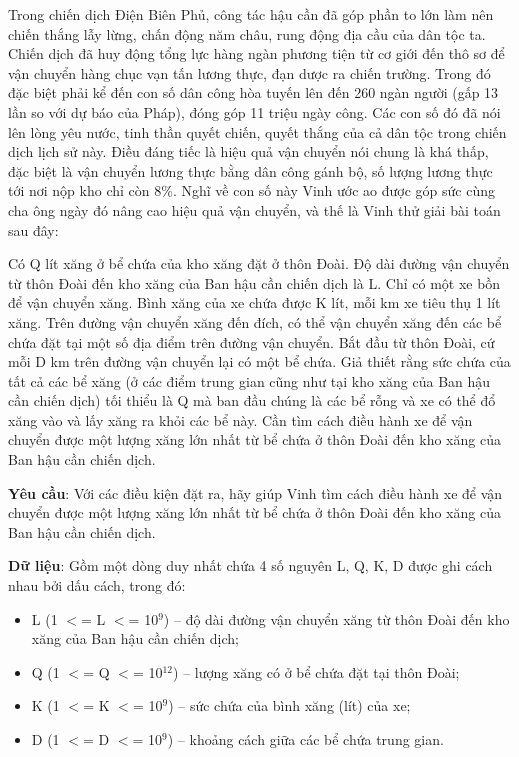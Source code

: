 

Trong chiến dịch Điện Biên Phủ, công tác hậu cần đã góp phần to lớn làm nên chiến thắng lẫy lừng, chấn động năm châu, rung động địa cầu của dân tộc ta. Chiến dịch đã huy động tổng lực hàng ngàn phương tiện từ cơ giới đến thô sơ để vận chuyển hàng chục vạn tấn lương thực, đạn dược ra chiến trường. Trong đó đặc biệt phải kể đến con số dân công hòa tuyến lên đến 260 ngàn người (gấp 13 lần so với dự báo của Pháp), đóng góp 11 triệu ngày công. Các con số đó đã nói lên lòng yêu nước, tinh thần quyết chiến, quyết thắng của cả dân tộc trong chiến dịch lịch sử này. Điều đáng tiếc là hiệu quả vận chuyển nói chung là khá thấp, đặc biệt là vận chuyển lương thực bằng dân công gánh bộ, số lượng lương thực tới nơi nộp kho chỉ còn 8\%. Nghĩ về con số này Vinh ước ao được góp sức cùng cha ông ngày đó nâng cao hiệu quả vận chuyển, và thế là Vinh thử giải bài toán sau đây:

Có Q lít xăng ở bể chứa của kho xăng đặt ở thôn Đoài. Độ dài đường vận chuyển từ thôn Đoài đến kho xăng của Ban hậu cần chiến dịch là L. Chỉ có một xe bồn để vận chuyển xăng. Bình xăng của xe chứa được K lít, mỗi km xe tiêu thụ 1 lít xăng. Trên đường vận chuyển xăng đến đích, có thể vận chuyển xăng đến các bể chứa đặt tại một số địa điểm trên đường vận chuyển. Bắt đầu từ thôn Đoài, cứ mỗi D km trên đường vận chuyển lại có một bể chứa. Giả thiết rằng sức chứa của tất cả các bể xăng (ở các điểm trung gian cũng như tại kho xăng của Ban hậu cần chiến dịch) tối thiểu là Q mà ban đầu chúng là các bể rỗng và xe có thể đổ xăng vào và lấy xăng ra khỏi các bể này. Cần tìm cách điều hành xe để vận chuyển được một lượng xăng lớn nhất từ bể chứa ở thôn Đoài đến kho xăng của Ban hậu cần chiến dịch.

\textbf{Yêu cầu}: Với các điều kiện đặt ra, hãy giúp Vinh tìm cách điều hành xe để vận chuyển được một lượng xăng lớn nhất từ bể chứa ở thôn Đoài đến kho xăng của Ban hậu cần chiến dịch.

\textbf{Dữ liệu}: Gồm một dòng duy nhất chứa 4 số nguyên L, Q, K, D được ghi cách nhau bởi dấu cách, trong đó:
\begin{itemize}
	\item L (1 $<$= L $<$= 10$^9$) – độ dài đường vận chuyển xăng từ thôn Đoài đến kho xăng của Ban hậu cần chiến dịch;
	\item Q (1 $<$= Q $<$= 10$^12$) – lượng xăng có ở bể chứa đặt tại thôn Đoài;
	\item K (1 $<$= K $<$= 10$^9$) – sức chứa của bình xăng (lít) của xe;
	\item D (1 $<$= D $<$= 10$^9$) – khoảng cách giữa các bể chứa trung gian.
\end{itemize}

